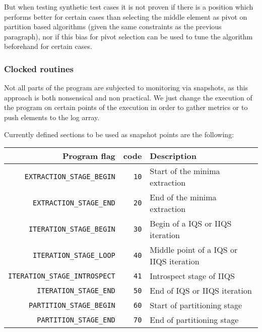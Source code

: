 But when testing synthetic test cases it is not proven if there is a position which performs better for certain cases than selecting the middle element as pivot on partition based algorithms (given the same constraints as the previous paragraph), nor if this bias for pivot selection can be used to tune the algorithm beforehand for certain cases.

\subsubsection{Clocked routines}
Not all parts of the program are subjected to monitoring via snapshots, as this approach is both nonsensical and non practical. We just change the execution of the program on certain points of the execution in order to gather metrics or to push elements to the log array. 

Currently defined sections to be used as snapshot points are the following:

\begin{tabularx}{\linewidth}{|r|r|X|}
    \hline
    Program flag & code & Description \\
    \hline
    \texttt{EXTRACTION\_STAGE\_BEGIN} & \texttt{10} & Start of the minima extraction\\
    \hline
    \texttt{EXTRACTION\_STAGE\_END} & \texttt{20} & End of the minima extraction \\
    \hline
    \texttt{ITERATION\_STAGE\_BEGIN} & \texttt{30} & Begin of a IQS or IIQS iteration \\
    \hline
    \texttt{ITERATION\_STAGE\_LOOP} & \texttt{40} & Middle point of a IQS or IIQS iteration \\
    \hline
    \texttt{ITERATION\_STAGE\_INTROSPECT} & \texttt{41} & Introspect stage of IIQS \\
    \hline
    \texttt{ITERATION\_STAGE\_END} & \texttt{50} & End of IQS or IIQS iteration \\
    \hline
    \texttt{PARTITION\_STAGE\_BEGIN} & \texttt{60} & Start of partitioning stage \\
    \hline
    \texttt{PARTITION\_STAGE\_END} & \texttt{70} & End of partitioning stage \\
    \hline
\end{tabularx}
